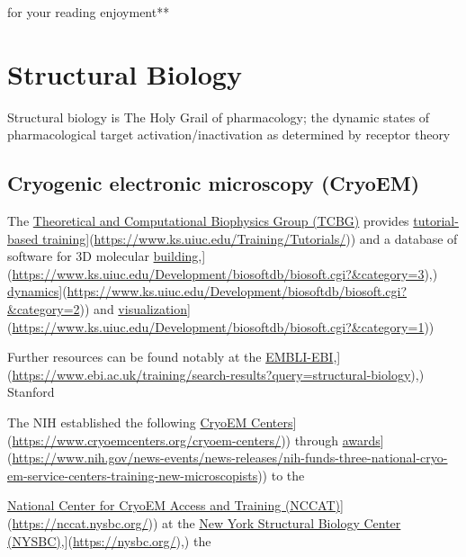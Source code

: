 \documentclass[
]{book}
\begin{document}
for your reading enjoyment**

\chapter{Structural Biology}\label{structural-biology}

Structural biology is The Holy Grail of pharmacology; the dynamic states of pharmacological target activation/inactivation as determined by receptor theory

\section{Cryogenic electronic microscopy (CryoEM)}\label{cryogenic-electronic-microscopy-cryoem}

The \href{}{Theoretical and Computational Biophysics Group (TCBG)} provides \href{\%5Bhttps://www.ks.uiuc.edu/Training/Tutorials/}{tutorial-based training}{]}(\url{https://www.ks.uiuc.edu/Training/Tutorials/})) and a database of software for 3D molecular \href{\%5Bhttps://www.ks.uiuc.edu/Development/biosoftdb/biosoft.cgi?&category=3}{building},{]}(\url{https://www.ks.uiuc.edu/Development/biosoftdb/biosoft.cgi?&category=3}),) \href{\%5Bhttps://www.ks.uiuc.edu/Development/biosoftdb/biosoft.cgi?&category=2}{dynamics}{]}(\url{https://www.ks.uiuc.edu/Development/biosoftdb/biosoft.cgi?&category=2})) and \href{\%5Bhttps://www.ks.uiuc.edu/Development/biosoftdb/biosoft.cgi?&category=1}{visualization}{]}(\url{https://www.ks.uiuc.edu/Development/biosoftdb/biosoft.cgi?&category=1}))

Further resources can be found notably at the \href{\%5Bhttps://www.ebi.ac.uk/training/search-results?query=structural-biology}{EMBLI-EBI},{]}(\url{https://www.ebi.ac.uk/training/search-results?query=structural-biology}),) Stanford

The NIH established the following \href{\%5Bhttps://www.cryoemcenters.org/cryoem-centers/}{CryoEM Centers}{]}(\url{https://www.cryoemcenters.org/cryoem-centers/})) through \href{\%5Bhttps://www.nih.gov/news-events/news-releases/nih-funds-three-national-cryo-em-service-centers-training-new-microscopists}{awards}{]}(\url{https://www.nih.gov/news-events/news-releases/nih-funds-three-national-cryo-em-service-centers-training-new-microscopists})) to the

\href{\%5Bhttps://nccat.nysbc.org/}{National Center for CryoEM Access and Training (NCCAT)}{]}(\url{https://nccat.nysbc.org/})) at the \href{\%5Bhttps://nysbc.org/}{New York Structural Biology Center (NYSBC)},{]}(\url{https://nysbc.org/}),) the
\end{document}
